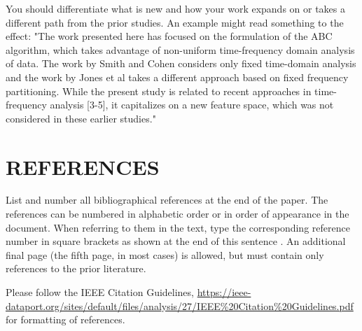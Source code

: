 \documentclass{article}
\begin{document}
You should differentiate what is new and how your work expands on
or takes a different path from the prior studies. An example might
read something to the effect: "The work presented here has focused
on the formulation of the ABC algorithm, which takes advantage of
non-uniform time-frequency domain analysis of data. The work by
Smith and Cohen \cite{Lamp86} considers only fixed time-domain analysis and
the work by Jones et al \cite{C2} takes a different approach based on
fixed frequency partitioning. While the present study is related
to recent approaches in time-frequency analysis [3-5], it capitalizes
on a new feature space, which was not considered in these earlier
studies."

\vfill\pagebreak

\section{REFERENCES}
\label{sec:refs}

List and number all bibliographical references at the end of the
paper. The references can be numbered in alphabetic order or in
order of appearance in the document. When referring to them in
the text, type the corresponding reference number in square
brackets as shown at the end of this sentence \cite{C2}. An
additional final page (the fifth page, in most cases) is
allowed, but must contain only references to the prior
literature.

Please follow the IEEE Citation Guidelines, \url{https://ieee-dataport.org/sites/default/files/analysis/27/IEEE\%20Citation\%20Guidelines.pdf} for formatting of references.



\end{document}
